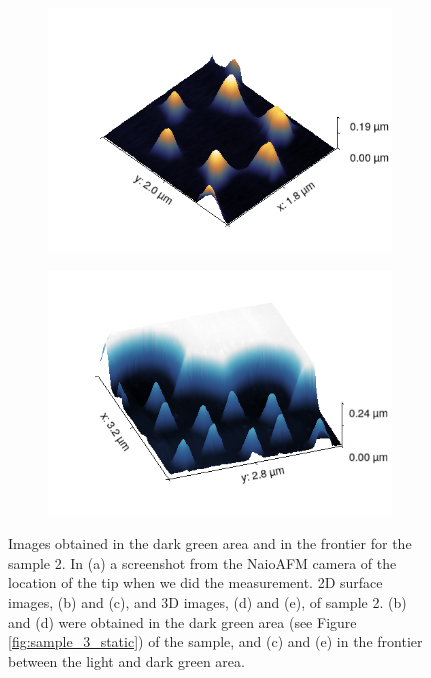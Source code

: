 \documentclass[11pt,a4paper]{article}
\begin{document}
\begin{figure}[H]
\begin{subfigure}[b]{0.45\textwidth}
\caption{}
\end{subfigure}\\\vspace{.2cm}
\begin{subfigure}[b]{0.45\textwidth}
\includegraphics[width=\textwidth]{sm_sample2_3D}
\caption{}
\end{subfigure}
\begin{subfigure}[b]{0.45\textwidth}
\includegraphics[width=\textwidth]{sm_sample2_border_3D}
\caption{}
\end{subfigure}
\caption{Images obtained in the dark green area and in the frontier for the sample 2. In (a) a screenshot from the NaioAFM camera of the location of the tip when we did the measurement. 2D surface images, (b) and (c), and 3D images, (d) and (e), of sample 2. (b) and (d) were obtained in the dark green area (see Figure \ref{fig:sample_3_static}) of the sample, and (c) and (e) in the frontier between the light and dark green area.}
\end{figure}
\end{document}
